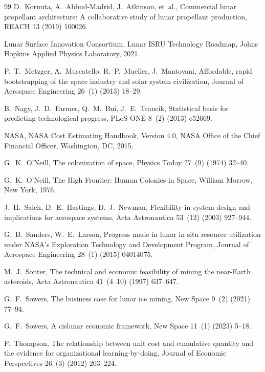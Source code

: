 \documentclass[preprint,12pt]{elsarticle}
\begin{document}
\begin{thebibliography}{99}
D.~Kornuta, A.~Abbud-Madrid, J.~Atkinson, et~al.,
\newblock Commercial lunar propellant architecture: A collaborative study of lunar propellant production,
\newblock REACH 13 (2019) 100026.

Lunar Surface Innovation Consortium,
\newblock Lunar ISRU Technology Roadmap,
\newblock Johns Hopkins Applied Physics Laboratory, 2021.

P.~T.~Metzger, A.~Muscatello, R.~P.~Mueller, J.~Mantovani,
\newblock Affordable, rapid bootstrapping of the space industry and solar system civilization,
\newblock Journal of Aerospace Engineering 26~(1) (2013) 18--29.

B.~Nagy, J.~D.~Farmer, Q.~M.~Bui, J.~E.~Trancik,
\newblock Statistical basis for predicting technological progress,
\newblock PLoS ONE 8~(2) (2013) e52669.

NASA,
\newblock NASA Cost Estimating Handbook, Version 4.0,
\newblock NASA Office of the Chief Financial Officer, Washington, DC, 2015.

G.~K.~O'Neill,
\newblock The colonization of space,
\newblock Physics Today 27~(9) (1974) 32--40.

G.~K.~O'Neill,
\newblock The High Frontier: Human Colonies in Space,
\newblock William Morrow, New York, 1976.

J.~H.~Saleh, D.~E.~Hastings, D.~J.~Newman,
\newblock Flexibility in system design and implications for aerospace systems,
\newblock Acta Astronautica 53~(12) (2003) 927--944.

G.~B.~Sanders, W.~E.~Larson,
\newblock Progress made in lunar in situ resource utilization under NASA's Exploration Technology and Development Program,
\newblock Journal of Aerospace Engineering 28~(1) (2015) 04014075.

M.~J.~Sonter,
\newblock The technical and economic feasibility of mining the near-Earth asteroids,
\newblock Acta Astronautica 41~(4--10) (1997) 637--647.

G.~F.~Sowers,
\newblock The business case for lunar ice mining,
\newblock New Space 9~(2) (2021) 77--94.

G.~F.~Sowers,
\newblock A cislunar economic framework,
\newblock New Space 11~(1) (2023) 5--18.

P.~Thompson,
\newblock The relationship between unit cost and cumulative quantity and the evidence for organizational learning-by-doing,
\newblock Journal of Economic Perspectives 26~(3) (2012) 203--224.


\end{thebibliography}
\end{document}
